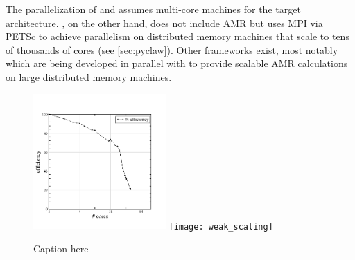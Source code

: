 The parallelization of \amrclaw and \geoclaw assumes multi-core machines for the
target architecture.  \pyclaw, on the other hand, does not include AMR but uses
MPI via PETSc to achieve parallelism on distributed memory machines that scale
to tens of thousands of cores (see \cref{sec:pyclaw}). Other frameworks exist,
most notably \forestclaw \cite{Burstedde:we} which are being developed in
parallel with \amrclaw to provide scalable AMR calculations on large distributed
memory machines.

\begin{figure}[h]
    \centering
    \includegraphics[width=0.45\textwidth]{efficiency}
    \texttt{[image: weak\_scaling]}
    \caption{Caption here}
    \label{fig:figure1}
\end{figure}